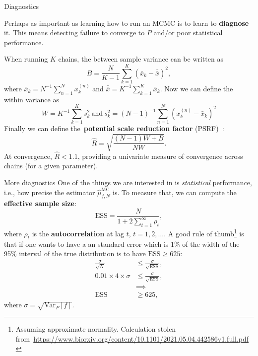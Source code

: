 \begin{frame}{Diagnostics}
\begin{idea}
Perhaps as important as learning how to run an MCMC is to learn to \textbf{diagnose} it.
This means detecting failure to converge to $P$ and/or poor statistical performance.
\end{idea}
When running $K$ chains,  the between sample variance can be written as
\begin{equation*}
\label{eq:Between}
 B = \frac{N}{K-1} \sum_{k = 1}^K \left(\bar{x}_k - \bar{\bar{x}}\right)^2, 
\end{equation*}
where $\bar{x}_k = N^{-1}\sum_{n = 1}^N x_k^{(n)}$ and $\bar{\bar{x}} = K^{-1}\sum_{k=1}^K\bar{x}_k$.
Now we can define the within variance as 
\begin{equation*}
W =  K^{-1}\sum_{k = 1}^K s_k^2 \: \text{and} \: s_k^2  = (N-1)^{-1} \sum_{n = 1}^N \left(x_k^{(n)} - \bar{x}_k\right)^2 
\end{equation*}
Finally we can define the~\textbf{potential scale reduction factor} (PSRF)~\citep{Gelman1992}:
\begin{equation*}
 \label{eq:PRSF}
 \hat{R} = \sqrt{\frac{ (N-1)W +  B }{NW}}.
\end{equation*}
At convergence, $\hat{R} < 1.1$, providing a univariate measure of convergence across chains (for a given parameter).
\end{frame}
\begin{frame}{More diagnostics}
One of the things we are interested in is \textit{statistical} performance, i.e., how precise the estimator $\hat{\mu}_{f,N}^{\text{MC}}$ is.
To measure that, we can compute the \textbf{effective sample size}:
\begin{equation*}
 \text{ESS} = \frac{N}{1 + 2\sum_{t=1}^\infty \rho_t},
\end{equation*}
where $\rho_t$ is the \textbf{autocorrelation} at lag $t$, $t=1, 2, \ldots$.
A good rule of thumb\footnote{Assuming approximate normality. Calculation stolen from~\url{https://www.biorxiv.org/content/10.1101/2021.05.04.442586v1.full.pdf}} is that if one wants to have a an standard error which is 1\% of the width of the 95\% interval of the true distribution is to have $\text{ESS} \geq 625$:
\begin{align*}
 \frac{\sigma}{\sqrt{N}} &\leq \frac{\sigma}{\sqrt{\text{ESS}}},\\
 0.01 \times 4 \times \sigma &\leq \frac{\sigma}{\sqrt{\text{ESS}}},\\
 &\implies\\
 \text{ESS} &\geq 625,
\end{align*}
where $\sigma = \sqrt{\text{Var}_{P}[f]}$.
\end{frame}
